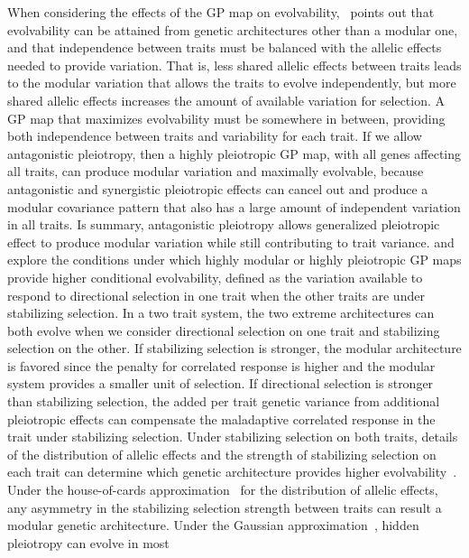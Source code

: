 \begin{refsection}
When considering the effects of the GP map on
evolvability,~\textcite{Hansen2003-fh} points out that evolvability can be
attained from genetic architectures other than a modular one, and that
independence between traits must be balanced with the allelic effects needed
to provide variation. That is, less shared allelic effects between traits
leads to the modular variation that allows the traits to evolve independently,
but more shared allelic effects increases the amount of available variation
for selection. A GP map that maximizes evolvability must be somewhere in
between, providing both independence between traits and variability for each
trait. If we allow antagonistic pleiotropy, then a highly pleiotropic GP map,
with all genes affecting all traits, can produce modular variation and
maximally evolvable, because antagonistic and synergistic pleiotropic effects
can cancel out and produce a modular covariance pattern that also has a large
amount of independent variation in all traits. Is summary, antagonistic
pleiotropy allows generalized pleiotropic effect to produce modular variation
while still contributing to trait variance. \textcite{Hansen2003-fh}
and~\textcite{Pavlicev2011-xm} explore the conditions under which highly
modular or highly pleiotropic GP maps provide higher conditional evolvability,
defined as the variation available to respond to directional selection in one
trait when the other traits are under stabilizing selection. In a two trait
system, the two extreme architectures can both evolve when we consider
directional selection on one trait and stabilizing selection on the other. If
stabilizing selection is stronger, the modular architecture is favored since
the penalty for correlated response is higher and the modular system provides
a smaller unit of selection. If directional selection is stronger than
stabilizing selection, the added per trait genetic variance from additional
pleiotropic effects can compensate the maladaptive correlated response in the
trait under stabilizing selection. Under stabilizing selection on both traits,
details of the distribution of allelic effects and the strength of stabilizing
selection on each trait can determine which genetic architecture provides
higher evolvability~\parencite{Pavlicev2011-xm}. Under the house-of-cards
approximation~\parencite{Turelli1984-cp} for the distribution of allelic
effects, any asymmetry in the stabilizing selection strength between traits
can result a modular genetic architecture. Under the Gaussian
approximation~\parencite{Lande1980-kn}, hidden pleiotropy can evolve in most

\end{refsection}
